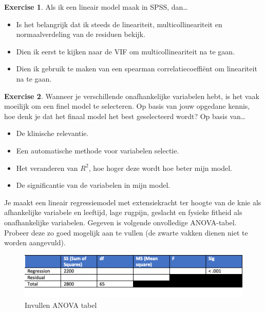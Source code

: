 \documentclass[
]{book}
\providecommand{\tightlist}{%
  \setlength{\itemsep}{0pt}\setlength{\parskip}{0pt}}
\theoremstyle{definition}
\theoremstyle{definition}
\theoremstyle{definition}
\newtheorem{exercise}{Exercise}[chapter]
\theoremstyle{definition}
\theoremstyle{remark}
\begin{document}
\begin{exercise}

Als ik een lineair model maak in SPSS, dan\ldots{}

\begin{itemize}
\tightlist
\item
  Is het belangrijk dat ik steeds de lineariteit, multicollineariteit en normaalverdeling van de residuen bekijk.
\item
  Dien ik eerst te kijken naar de VIF om multicollineariteit na te gaan.
\item
  Dien ik gebruik te maken van een spearman correlatiecoeffiënt om lineariteit na te gaan.
\end{itemize}

\end{exercise}

\begin{exercise}

Wanneer je verschillende onafhankelijke variabelen hebt, is het vaak moeilijk om een finel model te selecteren. Op basis van jouw opgedane kennis, hoe denk je dat het finaal model het best geselecteerd wordt? Op basis van\ldots{}

\begin{itemize}
\tightlist
\item
  De klinische relevantie.
\item
  Een automatische methode voor variabelen selectie.
\item
  Het veranderen van \(R^2\), hoe hoger deze wordt hoe beter mijn model.
\item
  De significantie van de variabelen in mijn model.
\end{itemize}

\end{exercise}

Je maakt een lineair regressiemodel met extensiekracht ter hoogte van de knie als afhankelijke variabele en leeftijd, lage rugpijn, geslacht en fysieke fitheid als onafhankelijke variabelen. Gegeven is volgende onvolledige ANOVA-tabel. Probeer deze zo goed mogelijk aan te vullen (de zwarte vakken dienen niet te worden aangevuld).

\begin{figure}
\includegraphics[width=1\linewidth]{img/ex_tab_lm} \caption{Invullen ANOVA tabel}\label{fig:extablm}
\end{figure}
\end{document}
